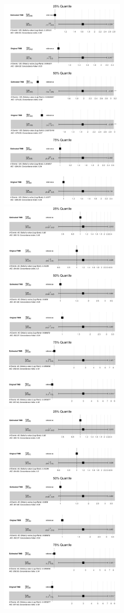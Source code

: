 \documentclass[12pt]{article}
\begin{document}
\begin{figure}[h]
    \centering
    \includegraphics[width=2.5in]{results/figures/skcm_forests.png}
    \includegraphics[width=2.5in]{results/figures/coadread_forests.png}
    \includegraphics[width=2.5in]{results/figures/blca_forests.png}

\end{figure}
\end{document}

